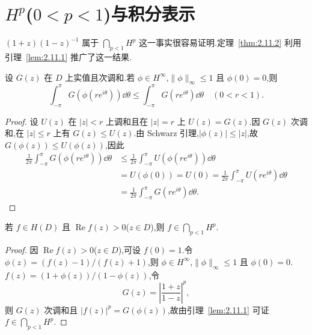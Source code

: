 \section{\texorpdfstring{$H^p$($0<p<1$)与积分表示}{Hp(0<p<1)与积分表示}}\label{sec:2.11}


$(1+z)(1-z)^{-1}$ 属于 $\bigcap_{p<1} H^{p}$ 这一事实很容易证明.定理~\ref{thm:2.11.2} 利用引理~\ref{lem:2.11.1} 推广了这一结果.

\begin{lemma}\label{lem:2.11.1}
设 $G(z)$ 在 $D$ 上实值且次调和.若 $\phi \in H^{\infty}$,$\|\phi\|_{\infty} \leq 1$ 且 $\phi(0) = 0$,则
\begin{equation*}
\int_{-\pi}^{\pi} G(\phi(re^{i\theta}))\dd \theta \leq \int_{-\pi}^{\pi} G(re^{i\theta})\dd \theta \quad (0 < r < 1).
\end{equation*}
\end{lemma}

\begin{proof}
设 $U(z)$ 在 $|z| < r$ 上调和且在 $|z| = r$ 上 $U(z) = G(z)$.因 $G(z)$ 次调和,在 $|z| \leq r$ 上有 $G(z) \leq U(z)$.由 Schwarz 引理,$|\phi(z)| \leq |z|$,故 $G(\phi(z)) \leq U(\phi(z))$,因此
\begin{align*}
\frac{1}{2\pi}\int_{-\pi}^{\pi} G(\phi(re^{i\theta}))\dd \theta & \leq \frac{1}{2\pi}\int_{-\pi}^{\pi} U(\phi(re^{i\theta}))\dd \theta \\
& = U(\phi(0)) = U(0) = \frac{1}{2\pi}\int_{-\pi}^{\pi} U(re^{i\theta})\dd \theta \\
& = \frac{1}{2\pi}\int_{-\pi}^{\pi} G(re^{i\theta})\dd \theta .
\end{align*}
\end{proof}

\begin{theorem}\label{thm:2.11.2}
若 $f \in H(D)$ 且 $\operatorname{Re} f(z) > 0$($z \in D$),则 $f \in \bigcap_{p<1} H^{p}$.
\end{theorem}

\begin{proof}
因 $\operatorname{Re} f(z) > 0$($z \in D$),可设 $f(0) = 1$.令 $\phi(z) = (f(z)-1)/(f(z)+1)$,则 $\phi \in H^{\infty}$,$\|\phi\|_{\infty} \leq 1$ 且 $\phi(0) = 0$.$f(z) = (1+\phi(z))/(1-\phi(z))$,令
\begin{equation*}
G(z) = \left| \frac{1+z}{1-z} \right|^{p},
\end{equation*}
则 $G(z)$ 次调和且 $|f(z)|^{p} = G(\phi(z))$,故由引理~\ref{lem:2.11.1} 可证 $f \in \bigcap_{p<1} H^{p}$.
\end{proof}

